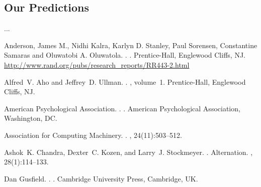 \documentclass[11pt]{article}
\begin{document}
\subsection{Our Predictions}
...


%
%

\begin{thebibliography}{}

Anderson, James M., Nidhi Kalra, Karlyn D. Stanley, Paul Sorensen, Constantine Samaras and Oluwatobi A. Oluwatola.
.
.
\newblock Prentice-{Hall}, Englewood Cliffs, NJ.
\newblock \href{http://www.rand.org/pubs/research\_reports/RR443-2.html}{http://www.rand.org/pubs/research\_reports/RR443-2.html}



Alfred~V. Aho and Jeffrey~D. Ullman.
.
, volume~1.
\newblock Prentice-{Hall}, Englewood Cliffs, NJ.

{American Psychological Association}.
.
.
\newblock American Psychological Association, Washington, DC.

{Association for Computing Machinery}.
.
, 24(11):503--512.

Ashok~K. Chandra, Dexter~C. Kozen, and Larry~J. Stockmeyer.
.
\newblock Alternation.
,
  28(1):114--133.

Dan Gusfield.
.
.
\newblock Cambridge University Press, Cambridge, UK.

\end{thebibliography}
\end{document}
